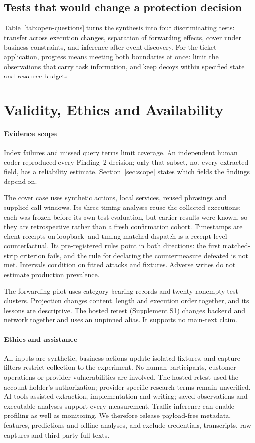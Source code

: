 \subsection{Tests that would change a protection decision}
Table~\ref{tab:open-questions} turns the synthesis into four discriminating tests: transfer across execution changes, separation of forwarding effects, cover under business constraints, and inference after event discovery. For the ticket application, progress means meeting both boundaries at once: limit the observations that carry task information, and keep decoys within specified state and resource budgets.

\section{Validity, Ethics and Availability}\label{sec:validity}
\paragraph{Evidence scope}
Index failures and missed query terms limit coverage. An independent human coder reproduced every Finding~2 decision; only that subset, not every extracted field, has a reliability estimate. Section~\ref{sec:scope} states which fields the findings depend on.

The cover case uses synthetic actions, local services, reused phrasings and supplied call windows. Its three timing analyses reuse the collected executions; each was frozen before its own test evaluation, but earlier results were known, so they are retrospective rather than a fresh confirmation cohort. Timestamps are client receipts on loopback, and timing-matched dispatch is a receipt-level counterfactual. Its pre-registered rules point in both directions: the first matched-strip criterion fails, and the rule for declaring the countermeasure defeated is not met. Intervals condition on fitted attacks and fixtures. Adverse writes do not estimate production prevalence.

The forwarding pilot uses category-bearing records and twenty nonempty test clusters. Projection changes content, length and execution order together, and its lessons are descriptive. The hosted retest (Supplement S1) changes backend and network together and uses an unpinned alias. It supports no main-text claim.

\paragraph{Ethics and assistance}
All inputs are synthetic, business actions update isolated fixtures, and capture filters restrict collection to the experiment. No human participants, customer operations or provider vulnerabilities are involved. The hosted retest used the account holder's authorization; provider-specific research terms remain unverified. AI tools assisted extraction, implementation and writing; saved observations and executable analyses support every measurement. Traffic inference can enable profiling as well as monitoring. We therefore release payload-free metadata, features, predictions and offline analyses, and exclude credentials, transcripts, raw captures and third-party full texts.

